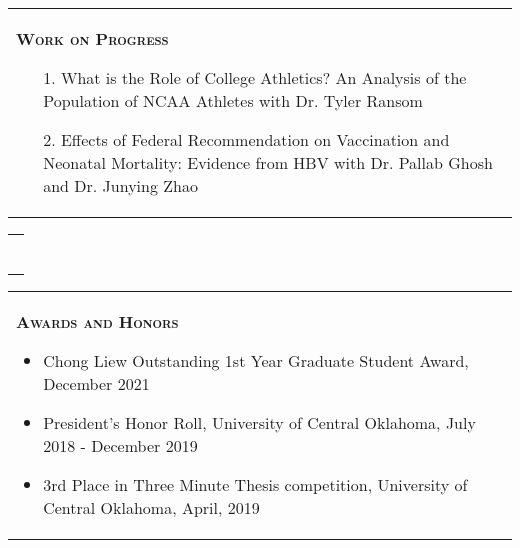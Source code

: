 \documentclass[10pt,letterpaper]{article}
\begin{document}
\begin{tabular}{p{7.5in}}

{\textsc{\textbf{Work on Progress}}}
\begin{enumerate}
\item[1.]  What is the Role of College Athletics? An Analysis of the Population of NCAA
Athletes with Dr.  Tyler Ransom

\item[2.] Effects of Federal Recommendation on Vaccination and Neonatal Mortality: 
Evidence from HBV with Dr. Pallab Ghosh and Dr.  Junying Zhao



\end{enumerate}
\end{tabular}


\begin{tabular}{p{7.5in}}


\multicolumn{1}{p{7.5in}}{\hrule}\\
\end{tabular}

\begin{tabular}{p{7.5in}}
	
	{\large \textsc{\textbf{\large{Awards and Honors}}}}
	\begin{itemize}
    \item Chong Liew Outstanding 1st Year Graduate Student Award, December 2021
    \item President's Honor Roll, University of Central Oklahoma, July 2018 - December 2019
    \item 3rd Place in Three Minute Thesis competition, University of Central Oklahoma, April, 2019
	\end{itemize}
	\\
\end{tabular}
\end{document}
